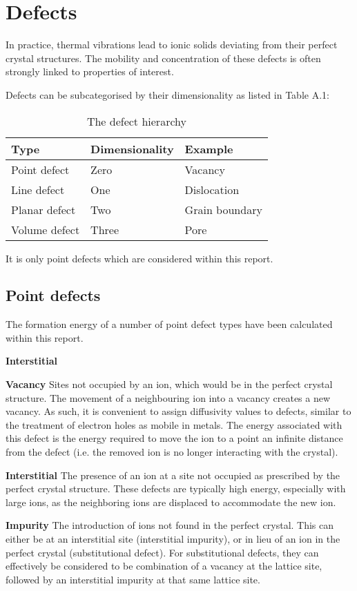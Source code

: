 \appendix
{}
\chapter{Defects}
In practice, thermal vibrations lead to ionic solids deviating from their perfect crystal structures. 
The mobility and concentration of these defects is often strongly linked to properties of interest.

Defects can be subcategorised by their dimensionality as listed in Table A.1:

\begin{table}[bh!]
\centering
\label{tab:defecthierarchy}
\caption{The defect hierarchy \citep{Carter2013}}
\begin{tabular}{@{}lll@{}}
\toprule
Type            & Dimensionality  & Example\\
\midrule
Point defect    & Zero            & Vacancy\\
Line defect     & One             & Dislocation\\
Planar defect   & Two             & Grain boundary\\
Volume defect   & Three           & Pore\\
\bottomrule
\end{tabular}
\end{table}

It is only point defects which are considered within this report.
\newpage
\section{Point defects}
The formation energy of a number of point defect types have been calculated within this report.


\begin{labeling}{\textbf{Interstitial}}
\item[\textbf{Vacancy}] Sites not occupied by an ion, which would be in the perfect crystal structure. The movement of a neighbouring ion into a vacancy creates a new vacancy. As such, it is convenient to assign diffusivity values to defects, similar to the treatment of electron holes as mobile in metals. The energy associated with this defect is the energy required to move the ion to a point an infinite distance from the defect (i.e. the removed ion is no longer interacting with the crystal).

\item[\textbf{Interstitial}] The presence of an ion at a site not occupied as prescribed by the perfect crystal structure. These defects are typically high energy, especially with large ions, as the neighboring ions are displaced to accommodate the new ion.
\item[\textbf{Impurity}] The introduction of ions not found in the perfect crystal. This can either be at an interstitial site (interstitial impurity), or in lieu of an ion in the perfect crystal (substitutional defect).
For substitutional defects, they can effectively be considered to be combination of a vacancy at the lattice site, followed by an interstitial impurity at that same lattice site.
\end{labeling}

